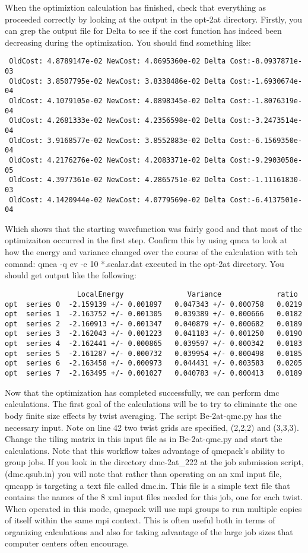 When the optimiztion calculation has finished, check that everything as proceeded correctly by looking at the output in the opt-2at directory.  Firstly, you can grep the output file for Delta to see if the cost function has indeed been decreasing during the optimization.  You should find something like:
\begin{lstlisting}
 OldCost: 4.8789147e-02 NewCost: 4.0695360e-02 Delta Cost:-8.0937871e-03
 OldCost: 3.8507795e-02 NewCost: 3.8338486e-02 Delta Cost:-1.6930674e-04
 OldCost: 4.1079105e-02 NewCost: 4.0898345e-02 Delta Cost:-1.8076319e-04
 OldCost: 4.2681333e-02 NewCost: 4.2356598e-02 Delta Cost:-3.2473514e-04
 OldCost: 3.9168577e-02 NewCost: 3.8552883e-02 Delta Cost:-6.1569350e-04
 OldCost: 4.2176276e-02 NewCost: 4.2083371e-02 Delta Cost:-9.2903058e-05
 OldCost: 4.3977361e-02 NewCost: 4.2865751e-02 Delta Cost:-1.11161830-03
 OldCost: 4.1420944e-02 NewCost: 4.0779569e-02 Delta Cost:-6.4137501e-04
\end{lstlisting}
Which shows that the starting wavefunction was fairly good and that most of the optimizaiton occurred in the first step.  Confirm this by using qmca to look at how the energy and variance changed over the course of the calculation with teh comand: qmca -q ev -e 10 *.scalar.dat executed in the opt-2at directory.  You should get output like the following:
\begin{lstlisting}
                 LocalEnergy               Variance             ratio
opt  series 0  -2.159139 +/- 0.001897   0.047343 +/- 0.000758   0.0219 
opt  series 1  -2.163752 +/- 0.001305   0.039389 +/- 0.000666   0.0182 
opt  series 2  -2.160913 +/- 0.001347   0.040879 +/- 0.000682   0.0189 
opt  series 3  -2.162043 +/- 0.001223   0.041183 +/- 0.001250   0.0190 
opt  series 4  -2.162441 +/- 0.000865   0.039597 +/- 0.000342   0.0183 
opt  series 5  -2.161287 +/- 0.000732   0.039954 +/- 0.000498   0.0185 
opt  series 6  -2.163458 +/- 0.000973   0.044431 +/- 0.003583   0.0205 
opt  series 7  -2.163495 +/- 0.001027   0.040783 +/- 0.000413   0.0189 
\end{lstlisting}

Now that the optimization has completed successfully, we can perform dmc calculations.  The first goal of the calculations will be to try to eliminate the one body finite size effects by twist averaging.  The script Be-2at-qmc.py has the necessary input.  Note on line 42 two twist grids are specified, (2,2,2) and (3,3,3).  Change the tiling matrix in this input file as in Be-2at-qmc.py and start the calculations.  Note that this workflow takes advantage of qmcpack's ability to group jobs.  If you look in the directory dmc-2at\_222 at the job submission script, (dmc.qsub.in) you will note that rather than operating on an xml input file, qmcapp is targeting a text file called dmc.in.  This file is a simple text file that contains the names of the 8 xml input files needed for this job, one for each twist.  When operated in this mode, qmcpack will use mpi groups to run multiple copies of itself within the same mpi context.  This is often useful both in terms of organizing calculations and also for taking advantage of the large job sizes that computer centers often encourage.

